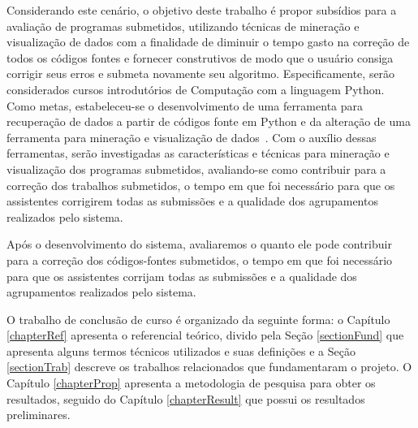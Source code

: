 	
	Considerando este cenário, o objetivo deste trabalho é propor subsídios para a
	avaliação de programas submetidos, utilizando técnicas de mineração e visualização
	de dados com a finalidade de diminuir o tempo gasto na correção de todos os códigos
	fontes e  fornecer  construtivos de modo que o usuário consiga
	corrigir seus erros e submeta novamente seu algoritmo. Especificamente, serão
	considerados cursos introdutórios de Computação com a linguagem Python. Como
	metas, estabeleceu-se o desenvolvimento de uma ferramenta para recuperação de
	dados a partir de códigos fonte em Python e da alteração de uma ferramenta para
	mineração e visualização de dados~\cite{Alencar}. Com o auxílio dessas ferramentas,
	serão investigadas as características e técnicas para mineração e visualização
	dos programas submetidos, avaliando-se como contribuir para
	a correção dos trabalhos submetidos, o tempo em que foi necessário para
	que os assistentes corrigirem todas as submissões e a qualidade dos agrupamentos
	realizados pelo sistema.
	
	Após o desenvolvimento do sistema, avaliaremos o quanto ele pode contribuir para
	a correção dos códigos-fontes submetidos, o tempo em que foi necessário para que
	os assistentes corrijam todas as submissões e a qualidade dos agrupamentos
	realizados pelo sistema.
	
	O trabalho de conclusão de curso é organizado da seguinte forma: o Capítulo
	\ref{chapterRef} apresenta o referencial teórico, divido pela Seção \ref{sectionFund}
	que apresenta alguns termos técnicos utilizados e suas definições e a Seção
	\ref{sectionTrab} descreve os trabalhos relacionados que fundamentaram o projeto.
	O Capítulo \ref{chapterProp} apresenta a metodologia de pesquisa para obter os
	resultados, seguido do Capítulo \ref{chapterResult} que possui os resultados
	preliminares.